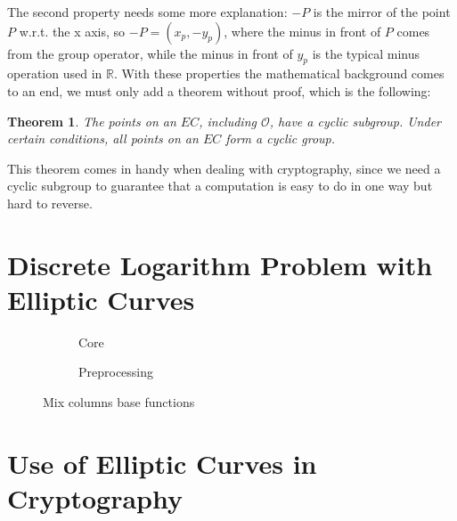 \documentclass{article}
\newtheorem*{remark}{Theorem}
\begin{document}
The second property needs some more explanation: $-P$ is the mirror of the point $P$ w.r.t. the x axis, so $-P = (x_p, -y_p)$, where the minus in front of $P$ comes from the group operator, while the minus in front of $y_p$ is the typical minus operation used in $\mathbb{R}$. With these properties the mathematical background comes to an end, we must only add a theorem without proof, which is the following:

\begin{remark}
	The points on an $EC$, including $\mathcal{O}$, have a cyclic subgroup. Under certain conditions, all points on an $EC$ form a cyclic group.
\end{remark} 

This theorem comes in handy when dealing with cryptography, since we need a cyclic subgroup to guarantee that a computation is easy to do in one way but hard to reverse.


\section{Discrete Logarithm Problem with Elliptic Curves}


\begin{figure}[H]
\centering
\begin{subfigure}{.54\textwidth}
  \centering
  \caption{Core}
  \label{fig:core}
\end{subfigure}
\begin{subfigure}{.35\textwidth}
  \centering
  \caption{Preprocessing}
  \label{fig:preprocessing}
\end{subfigure}
\caption{Mix columns base functions}
\label{fig:MixColumns}
\end{figure}
 

\section{Use of Elliptic Curves in Cryptography}
\end{document}
